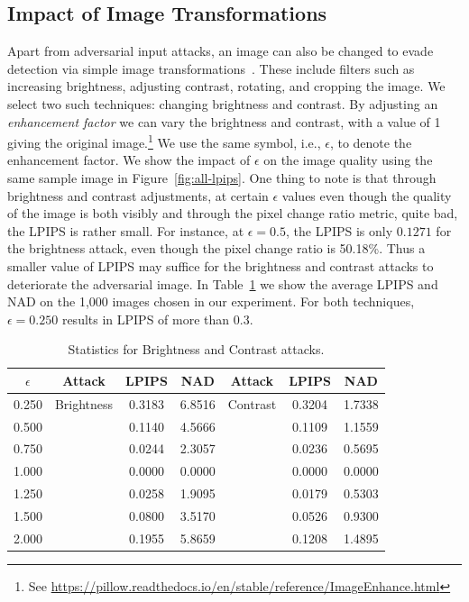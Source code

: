 \documentclass[pdflatex,sn-mathphys-num]{sn-jnl}
\theoremstyle{definition}
\begin{document}
\subsection{Impact of Image Transformations}
Apart from adversarial input attacks, an image can also be changed to evade detection via simple image transformations~\cite{struppek2022neuralhashbreak}. These include filters such as increasing brightness, adjusting contrast, rotating, and cropping the image. We select two such techniques: changing brightness and contrast. By adjusting an \emph{enhancement factor} we can vary the brightness and contrast, with a value of 1 giving the original image.\footnote{See \url{https://pillow.readthedocs.io/en/stable/reference/ImageEnhance.html}} We use the same symbol, i.e., $\epsilon$, to denote the enhancement factor. We show the impact of $\epsilon$ on the image quality using the same sample image in Figure~\ref{fig:all-lpips}. One thing to note is that through brightness and contrast adjustments, at certain $\epsilon$ values even though the quality of the image is both visibly and through the pixel change ratio metric, quite bad, the LPIPS is rather small. For instance, at $\epsilon = 0.5$, the LPIPS is only $0.1271$ for the brightness attack, even though the pixel change ratio is 50.18\%. Thus a smaller value of LPIPS may suffice for the brightness and contrast attacks to deteriorate the adversarial image. In Table~\ref{tab:brightness_contrast_stats} we show the average LPIPS and NAD on the 1,000 images chosen in our experiment. For both techniques, $\epsilon = 0.250$ results in LPIPS of more than $0.3$.

\begin{table}[h]
\centering
\begin{tabular}{c|ccc|ccc}
$\epsilon$ & Attack & LPIPS & NAD & Attack & LPIPS & NAD \\
\hline \hline
0.250 & Brightness & 0.3183 & 6.8516  & Contrast & 0.3204 & 1.7338 \\
0.500 &      & 0.1140 & 4.5666 &     & 0.1109 & 1.1559 \\
0.750 &     & 0.0244 & 2.3057&     & 0.0236 & 0.5695  \\
1.000 &     & 0.0000 & 0.0000 &     & 0.0000 & 0.0000 \\
1.250 &     & 0.0258 & 1.9095 &     & 0.0179 & 0.5303 \\
1.500 &     & 0.0800 & 3.5170 &     & 0.0526 & 0.9300 \\
2.000 &     & 0.1955 & 5.8659 &     & 0.1208 & 1.4895
\end{tabular}
\caption{Statistics for Brightness and Contrast attacks.}
\label{tab:brightness_contrast_stats}
\end{table}
\end{document}

